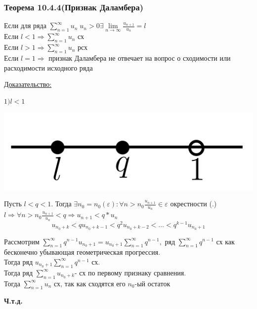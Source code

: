 \documentclass[12pt]{article}
\let\ORIincludegraphics\includegraphics
\renewcommand{\includegraphics}[2][]{\ORIincludegraphics[scale=0.65,#1]{#2}}
\let\oldsum\sum
\let\oldlim\lim
\renewcommand{\sum}{\oldsum\limits}
\renewcommand{\lim}{\oldlim\limits}
\begin{document}
  \subsubsection*{Теорема 10.4.4(Признак Даламбера)}\label{th:10.4.4}
  \par\noindent
  Если для ряда $\sum_{n=1}^{\infty} u_n \; u_n>0 \exists \lim_{n\to \infty} \frac{u_{n+1}}{u_n}=l$\\
  Если $l<1 \Rightarrow \sum_{n=1}^{\infty} u_n$ сх\\
  Если $l>1 \Rightarrow \sum_{n=1}^{\infty} u_n$ рсх\\
  Если $l=1 \Rightarrow$ признак Даламбера не отвечает на вопрос о сходимости или расходимости исходного ряда

  \underline{Доказательство:}
  \begin{adjustwidth}{1.5em}{1.5em}
    \begin{minipage}{0.2\textwidth}
      $1) l<1$
    \end{minipage}
    \hspace{1em}
    \begin{minipage}{0.55\textwidth}
      \includegraphics[scale=0.3]{10.4.2.png}
    \end{minipage}
    \vspace{1em}
    \par

    Пусть $l<q<1$. Тогда $\exists n_0=n_0(\varepsilon):\forall n>n_0 \frac{u_{n+1}}{u_n}\in \varepsilon$ окрестности (.) 
    $l \Rightarrow \forall n>n_0 \frac{u_{n+1}}{u_n}<q \Rightarrow u_{n+1} < q*u_n$\\
    \[u_{n_0+k}<qu_{n_0+k-1}<q^2 u_{n_0+k-2} < \dots < q^{k-1}u_{n_0+1}\]

    Рассмотрим $\sum_{n=1}^{\infty} q^{n-1} u_{n_0+1}=u_{n_0+1}\sum_{n=1}^{\infty}q^{n-1},$ ряд
    $\sum_{n=1}^{\infty}q^{n-1}$ сх как бесконечно убывающая геометрическая прогрессия.\\
    Тогда ряд $u_{n_0+1}\sum_{n=1}^{\infty}q^{n-1}$ сх.\\
    Тогда ряд $\sum_{n=1}^{\infty} u_{n_0+k}$- сх по первому признаку сравнения.\\
    Тогда $\sum_{n=1}^{\infty} u_n$ сх, так как сходятся его $n_0$-ый остаток
    \begin{center}
      \textbf{Ч.т.д.}
    \end{center}
    

\end{adjustwidth}
\end{document}
